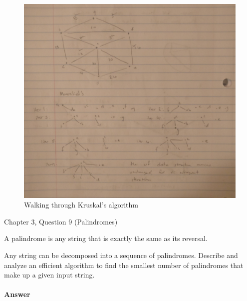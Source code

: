 \documentclass{article}
\begin{document}
\begin{figure}[h]
    \begin{center}
        \includegraphics[scale=0.1]{img/kruskal-walk-through}
        \caption{Walking through Kruskal's algorithm}
        \label{fig:kruskal}
    \end{center}
\end{figure}


\nextprob
{}

Chapter 3, Question 9 (Palindromes)

A palindrome is any string that is exactly the same as its reversal.

Any string can be decomposed into a sequence of palindromes.
Describe and analyze an efficient algorithm to find the smallest number of palindromes that make up a given input string.

\paragraph{Answer}

\end{document}
